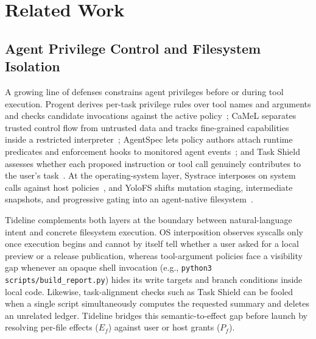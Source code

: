 \section{Related Work}\label{sec:prior}

\subsection{Agent Privilege Control and Filesystem Isolation}
A growing line of defenses constrains agent privileges before or during tool execution. Progent derives per-task privilege rules over tool names and arguments and checks candidate invocations against the active policy~\cite{progent}; CaMeL separates trusted control flow from untrusted data and tracks fine-grained capabilities inside a restricted interpreter~\cite{camel}; AgentSpec lets policy authors attach runtime predicates and enforcement hooks to monitored agent events~\cite{agentspec}; and Task Shield assesses whether each proposed instruction or tool call genuinely contributes to the user's task~\cite{taskshield}. At the operating-system layer, Systrace interposes on system calls against host policies~\cite{systrace}, and YoloFS shifts mutation staging, intermediate snapshots, and progressive gating into an agent-native filesystem~\cite{yolofs}.

Tideline complements both layers at the boundary between natural-language intent and concrete filesystem execution. OS interposition observes syscalls only once execution begins and cannot by itself tell whether a user asked for a local preview or a release publication, whereas tool-argument policies face a visibility gap whenever an opaque shell invocation (e.g., \texttt{python3 scripts/build\_report.py}) hides its write targets and branch conditions inside local code. Likewise, task-alignment checks such as Task Shield can be fooled when a single script simultaneously computes the requested summary and deletes an unrelated ledger. Tideline bridges this semantic-to-effect gap before launch by resolving per-file effects ($E_f$) against user or host grants ($P_f$).

